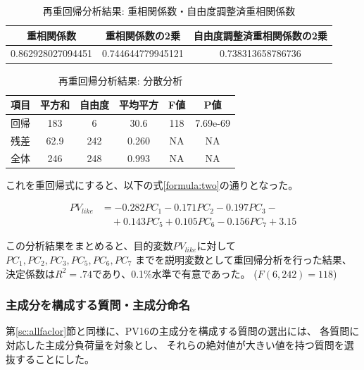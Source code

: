 \documentclass[11pt,a4paper, uplatex]{jsarticle}
\begin{document}
\begin{table}[htbp]
  \begin{center}
    \caption{再重回帰分析結果: 重相関係数・自由度調整済重相関係数}
    \begin{tabular}{c|c|c}
      \hline
      重相関係数 & 重相関係数の2乗 & 自由度調整済重相関係数の2乗 \\ \hline \hline
      0.862928027094451 & 0.744644779945121 & 0.738313658786736
    \end{tabular}
    \label{Rs-new}
  \end{center}
\end{table}

\begin{table}[htbp]
  \begin{center}
    \caption{再重回帰分析結果: 分散分析}
    \begin{tabular}{c|c|c|c|c|c}
      \hline
      項目 & 平方和 & 自由度 & 平均平方 & F値 & P値 \\ \hline \hline
      回帰 & 183 & 6 & 30.6 & 118 & 7.69e-69 \\
      残差 & 62.9 & 242 & 0.260 & NA & NA \\
      全体 & 246 & 248 & 0.993 & NA & NA \\
    \end{tabular}
    \label{annova-new}
  \end{center}
\end{table}

これを重回帰式にすると、以下の式\ref{formula:two}の通りとなった。

\begin{equation}
  \label{formula:two}
  \begin{split}
    PV_{like} &= -0.282PC_1 - 0.171PC_2 - 0.197PC_3 - \\
    &\quad + 0.143PC_5 + 0.105PC_6 - 0.156PC_7 + 3.15
  \end{split}
\end{equation}

この分析結果をまとめると、目的変数$ PV_{like} $に対して
$ PC_1, PC_2, PC_3, PC_5, PC_6, PC_7$
までを説明変数として重回帰分析を行った結果、
決定係数は$ R^2 = .74 $であり、0.1\%水準で有意であった。
($ F(6, 242) = 118 $)

\subsubsection{主成分を構成する質問・主成分命名}
\label{sc:pvpcq}
第\ref{sc:allfaclor}節と同様に、PV16の主成分を構成する質問の選出には、
各質問に対応した主成分負荷量を対象とし、
それらの絶対値が大きい値を持つ質問を選抜することにした。
\end{document}
